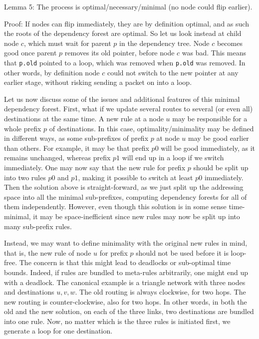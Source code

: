 Lemma 5: The process is optimal/necessary/minimal (no node could flip earlier).

Proof: If nodes can flip immediately, they are by definition optimal, and as such the roots of the dependency forest are optimal. So let us look instead at child node $c$, which must wait for parent $p$ in the dependency tree. Node $c$ becomes good once parent $p$ removes its old pointer, before node $c$ was bad. This means that \texttt{p.old} pointed to a loop, which was removed when \texttt{p.old} was removed. In other words, by definition node $c$ could not switch to the new pointer at any earlier stage, without risking sending a packet on into a loop.

Let us now discuss some of the issues and additional features of this minimal dependency forest. First, what if we update several routes to several (or even all) destinations at the same time. A new rule at a node $u$ may be responsible for a whole prefix $p$ of destinations. In this case, optimality/minimality may be defined in different ways, as some sub-prefixes of prefix $p$ at node $u$ may be good earlier than others. For example, it may be that prefix $p0$ will be good immediately, as it remains unchanged, whereas prefix $p1$ will end up in a loop if we switch immediately. One may now say that the new rule for prefix $p$ should be split up into two rules $p0$ and $p1$, making it possible to switch at least $p0$ immediately. Then the solution above is straight-forward, as we just split up the addressing space into all the minimal sub-prefixes, computing dependency forests for all of them independently. However, even though this solution is in some sense time-minimal, it may be space-inefficient since new rules may now be split up into many sub-prefix rules.

Instead, we may want to define minimality with the original new rules in mind, that is, the new rule of node $u$ for prefix $p$ should not be used before it is loop-free. The concern is that this might lead to deadlocks or sub-optimal time bounds. Indeed, if rules are bundled to meta-rules arbitrarily, one might end up with a deadlock. The canonical example is a triangle network with three nodes and destinations $u,v,w$. The old routing is always clockwise, for two hops. The new routing is counter-clockwise, also for two hops. In other words, in both the old and the new solution, on each of the three links, two destinations are bundled into one rule. Now, no matter which is the three rules is initiated first, we generate a loop for one destination.

